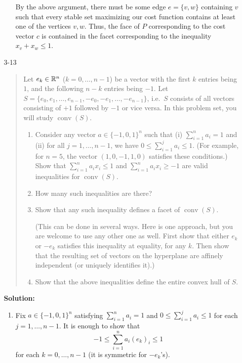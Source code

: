 \documentclass[12pt]{article}
\newcommand{\conv}{\operatorname{conv}}
\begin{document}
\begin{enumerate}
\begin{enumerate}
By the above argument, there must be some edge $e = \{v,w\}$ containing $v$ such that every stable set maximizing our cost function contains at least one of the vertices $v,w$. Thus, the face of $P$ corresponding to the cost vector $c$ is contained in the facet corresponding to the inequality $x_v + x_w \le 1$.
\end{enumerate}

\item[3-13] %
\begin{quote}
Let $e_k\in {\mathbb R}^n$ ($k=0,\ldots,n-1$) be a vector with the first $k$
entries being $1$, and the following $n-k$ entries being  $-1$. Let
$S=\{e_0, e_1, \ldots, e_{n-1}, -e_0, -e_1,\ldots, -e_{n-1}\}$, i.e.\
$S$ consists of all vectors consisting of $+1$ followed by $-1$ or
vice versa. In this problem set, you will study $\conv(S)$.
\begin{enumerate}
\item
Consider any vector $a\in\{-1,0,1\}^n$ such that (i) $\sum_{i=1}^n
a_i=1$ and (ii) for all $j=1,\ldots,n-1$, we have $0\leq \sum_{i=1}^j
a_i\leq 1$. (For example, for $n=5$, the vector $(1,0,-1,1,0)$
satisfies these conditions.)
Show that $\sum_{i=1}^n a_ix_i\leq 1$ and $\sum_{i=1}^n
a_ix_i\geq -1$ are valid inequalities for $\conv(S)$.
\item
How many such inequalities are there?
\item
Show that any such inequality defines a facet of $\conv(S)$.

(This can be done in several ways. Here is one approach, but you are
welcome to use any other one as well. First show that either $e_k$ or
$-e_k$ satisfies this inequality at equality, for any $k$. Then show that the
resulting set of vectors on the hyperplane are affinely independent (or uniquely identifies it).)
\item
Show that the above inequalities define the entire convex hull of $S$.

\end{enumerate}
\end{quote}

\textbf{Solution: }

\begin{enumerate}
\item Fix $a \in \{-1, 0, 1\}^n$ satisfying $\sum_{i=1}^n a_i = 1$ and $0 \leq \sum_{i=1}^j a_i \leq 1$ for each $j=1,\dotsc,n-1$. It is enough to show that
$$
-1 \leq \sum_{i=1}^n a_i (e_k)_i \leq 1
$$
for each $k=0,\dotsc,n-1$ (it is symmetric for $-e_k$'s).


\end{enumerate}
\end{enumerate}
\end{document}
